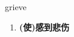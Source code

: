 
\begin{frame}
{\huge grieve}
\begin{center}
\begin{enumerate}\Large
  \item \textbf{(使)感到悲伤}
\end{enumerate}
\end{center}
\end{frame}
